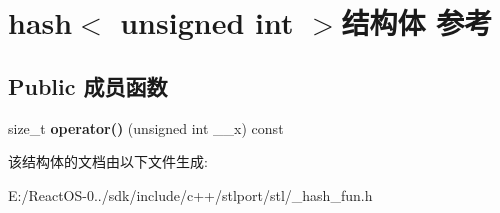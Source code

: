 \hypertarget{structhash_3_01unsigned_01int_01_4}{}\section{hash$<$ unsigned int $>$结构体 参考}
\label{structhash_3_01unsigned_01int_01_4}
\subsection*{Public 成员函数}
\begin{DoxyCompactItemize}
\item 
\mbox{\label{structhash_3_01unsigned_01int_01_4_a67d5bc1325182bb7f009c42c308bf76e}} 
size\+\_\+t {\bfseries operator()} (unsigned int \+\_\+\+\_\+x) const
\end{DoxyCompactItemize}


该结构体的文档由以下文件生成\+:\begin{DoxyCompactItemize}
\item 
E\+:/\+React\+O\+S-\/0../sdk/include/c++/stlport/stl/\+\_\+hash\+\_\+fun.\+h\end{DoxyCompactItemize}
